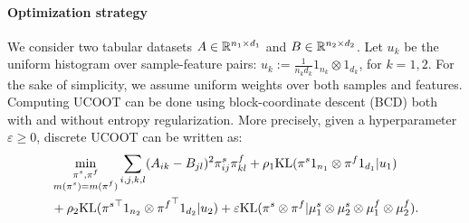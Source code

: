 \paragraph{Optimization strategy}
We consider two tabular datasets $A \in \mathbb R^{n_1 \times d_1}$ and $B \in \mathbb R^{n_2 \times d_2}$.
Let $u_k$ be the uniform histogram over sample-feature pairs:
$u_k := \frac{1}{n_kd_k}1_{n_k} \otimes 1_{d_k}$, for $k=1, 2$.
For the sake of simplicity, we assume uniform weights over both samples and features.
Computing UCOOT can be done using block-coordinate descent (BCD) both with
and without entropy regularization. More precisely, given a hyperparameter $\varepsilon \geq 0$,
discrete UCOOT can be written as:
\begin{equation}
\begin{split}
    \label{eq:ucoot-discrete-2}
  &\min_{\substack{\pi^s, \pi^f \\
  \iffalse \in \bbR_+^{n_1, n_2} \\ \pi^f \in \bbR_+^{d_1, d_2} \\ \fi m(\pi^s) = m(\pi^f)}}
  \sum_{i, j, k, l} (A_{ik} - B_{jl})^2\pi^s_{ij}\pi^f_{kl} +
  \rho_1 \kl(\pi^s 1_{n_1} \otimes \pi^f 1_{d_1} | u_1 )  \\
  &+ \rho_2 \kl({\pi^s}^\top 1_{n_2} \otimes {\pi^f}^{\top} 1_{d_2} | u_2) +
  \varepsilon \kl( \pi^s \otimes \pi^f | \mu^s_1 \otimes \mu_2^s \otimes \mu_1^f \otimes \mu_2^f).
\end{split}
\end{equation}

